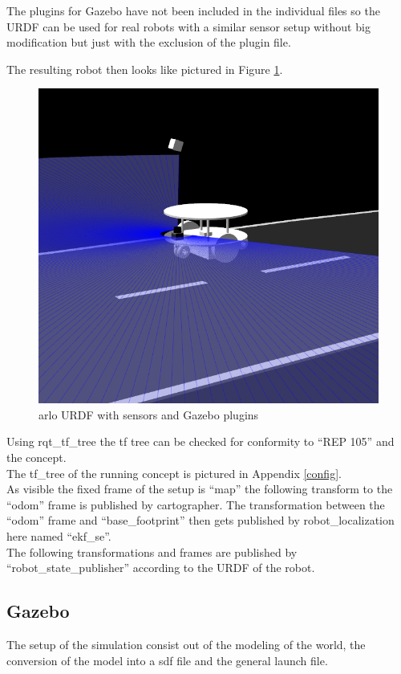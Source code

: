 The plugins for Gazebo have not been included in the individual files so the URDF can be used for real robots with a similar sensor setup without big modification but just with the exclusion of the plugin file.

The resulting robot then looks like pictured in Figure \ref{arlourdf}.

\begin{figure}[H]
	\includegraphics[width=\textwidth]{Pictures/arlourdf}
	\caption{arlo URDF with sensors and Gazebo plugins}
	\label{arlourdf}
\end{figure}


Using rqt\_tf\_tree the tf tree can be checked for conformity to ``REP 105'' and the concept.\\ 
The tf\_tree of the running concept is pictured in Appendix \ref{config}.\\
As visible the fixed frame of the setup is ``map'' the following transform to the ``odom'' frame is published by cartographer. The transformation between the ``odom'' frame and ``base\_footprint'' then gets published by robot\_localization here named ``ekf\_se''.\\
The following transformations and frames are published by ``robot\_state\_publisher'' according to the URDF of the robot.

\subsection{Gazebo}
The setup of the simulation consist out of the modeling of the world, the conversion of the model into a sdf file and the general launch file.

